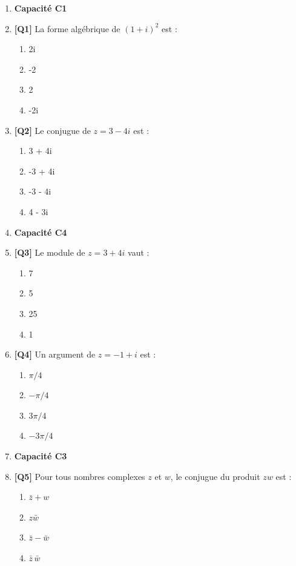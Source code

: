 \begin{enumerate}

\item[] \textbf{Capacité C1}

\item \textbf{[Q1]} La forme algébrique de $(1+i)^2$ est :
  \begin{enumerate}[label=\Alph*.]
    \item 2i
    \item -2
    \item 2
    \item -2i
  \end{enumerate}

\item \textbf{[Q2]} Le conjugue de $z = 3 - 4i$ est :
  \begin{enumerate}[label=\Alph*.]
    \item 3 + 4i
    \item -3 + 4i
    \item -3 - 4i
    \item 4 - 3i
  \end{enumerate}

\item[] \textbf{Capacité C4}

\item \textbf{[Q3]} Le module de $z = 3 + 4i$ vaut :
  \begin{enumerate}[label=\Alph*.]
    \item 7
    \item 5
    \item 25
    \item 1
  \end{enumerate}

\item \textbf{[Q4]} Un argument de $z = -1 + i$ est :
  \begin{enumerate}[label=\Alph*.]
    \item $\pi/4$
    \item $-\pi/4$
    \item $3\pi/4$
    \item $-3\pi/4$
  \end{enumerate}

\item[] \textbf{Capacité C3}

\item \textbf{[Q5]} Pour tous nombres complexes $z$ et $w$, le conjugue du produit $zw$ est :
  \begin{enumerate}[label=\Alph*.]
    \item $\bar z+w$
    \item $z\bar w$
    \item $\bar z-\bar w$
    \item $\bar z\,\bar w$
  \end{enumerate}


\end{enumerate}
